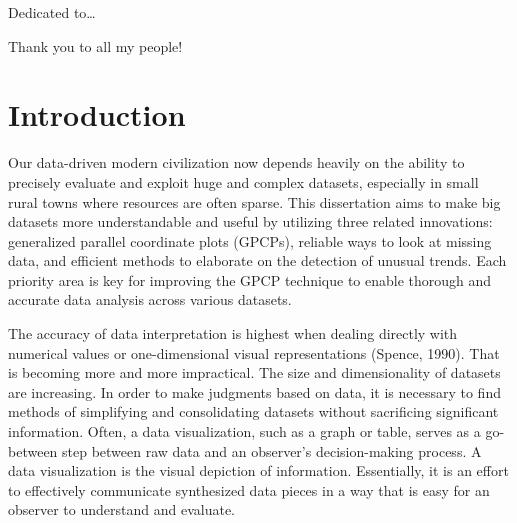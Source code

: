 \documentclass[print]{nuthesis}
\begin{document}
\begin{dedication}
Dedicated to\ldots{}
\end{dedication}

\begin{acknowledgments}
Thank you to all my people!
\end{acknowledgments}


\tableofcontents

\listoffigures
\listoftables

\mainmatter


\hypertarget{introduction}{%
\chapter{Introduction}\label{introduction}}

Our data-driven modern civilization now depends heavily on the ability to precisely evaluate and exploit huge and complex datasets, especially in small rural towns where resources are often sparse.
This dissertation aims to make big datasets more understandable and useful by utilizing three related innovations: generalized parallel coordinate plots (GPCPs), reliable ways to look at missing data, and efficient methods to elaborate on the detection of unusual trends.
Each priority area is key for improving the GPCP technique to enable thorough and accurate data analysis across various datasets.

The accuracy of data interpretation is highest when dealing directly with numerical values or one-dimensional visual representations (Spence, 1990).
That is becoming more and more impractical. The size and dimensionality of datasets are increasing.
In order to make judgments based on data, it is necessary to find methods of simplifying and consolidating datasets without sacrificing significant information.
Often, a data visualization, such as a graph or table, serves as a go-between step between raw data and an observer's decision-making process. A data visualization is the visual depiction of information.
Essentially, it is an effort to effectively communicate synthesized data pieces in a way that is easy for an observer to understand and evaluate.
\end{document}
